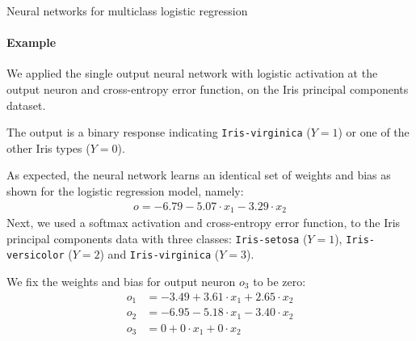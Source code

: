 %
\begin{frame}{Neural networks for multiclass logistic regression}
\framesubtitle{Example}
    We applied the single output neural network %
with logistic
    activation at the output neuron and cross-entropy error function, 
    on the Iris principal components dataset. 

	\medskip

	The output is
a binary response indicating {\tt Iris-virginica} ($Y=1$) or one of
the other Iris types ($Y=0$). 

\medskip

As expected, 
the neural network learns an identical set
of weights and bias as shown for the logistic regression model,
namely:
    \begin{align*}
        o = -6.79 -5.07 \cdot x_1 - 3.29 \cdot x_2
    \end{align*}
    Next, we %
used a softmax
activation and cross-entropy error function,
to the Iris
principal components data with three classes: {\tt Iris-setosa}
($Y=1$), {\tt Iris-versicolor} ($Y=2$) and {\tt Iris-virginica}
($Y=3$). 

\medskip

We fix the weights and bias for
output neuron $o_3$ to be zero:
    \begin{align*}
        o_1 & = -3.49 + 3.61 \cdot x_1 + 2.65 \cdot x_2\\
        o_2 & = -6.95 -5.18 \cdot x_1 -3.40 \cdot x_2\\
        o_3 & = 0 + 0 \cdot x_1 + 0 \cdot x_2
    \end{align*}
\end{frame}

